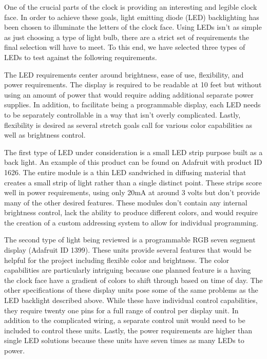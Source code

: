\documentclass[onecolumn, draftclsnofoot,10pt, compsoc]{IEEEtran}
\begin{document}
One of the crucial parts of the clock is providing an interesting and legible clock face.
In order to achieve these goals, light emitting diode (LED) backlighting has been chosen to illuminate the letters of the clock face.
Using LEDs isn’t as simple as just choosing a type of light bulb, there are a strict set of requirements the final selection will have to meet.
To this end, we have selected three types of LEDs to test against the following requirements.

The LED requirements center around brightness, ease of use, flexibility, and power requirements.
The display is required to be readable at 10 feet but without using an amount of power that would require adding additional separate power supplies.
In addition, to facilitate being a programmable display, each LED needs to be separately controllable in a way that isn’t overly complicated.
Lastly, flexibility is desired as several stretch goals call for various color capabilities as well as brightness control.

The first type of LED under consideration is a small LED strip purpose built as a back light.
An example of this product can be found on Adafruit with product ID 1626. \cite{led1}
The entire module is a thin LED sandwiched in diffusing material that creates a small strip of light rather than a single distinct point.
These strips score well in power requirements, using only 20mA at around 3 volts but don’t provide many of the other desired features.
These modules don’t contain any internal brightness control, lack the ability to produce different colors, and would require the creation of a custom addressing system to allow for individual programming.

The second type of light being reviewed is a programmable RGB seven segment display (Adafruit ID 1399). \cite{led2}
These units provide several features that would be helpful for the project including flexible color and brightness.
The color capabilities are particularly intriguing because one planned feature is a having the clock face have a gradient of colors to shift through based on time of day.
The other specifications of these display units pose some of the same problems as the LED backlight described above.
While these have individual control capabilities, they require twenty one pins for a full range of control per display unit.
In addition to the complicated wiring, a separate control unit would need to be included to control these units.
Lastly, the power requirements are higher than single LED solutions because these units have seven times as many LEDs to power.
\end{document}
